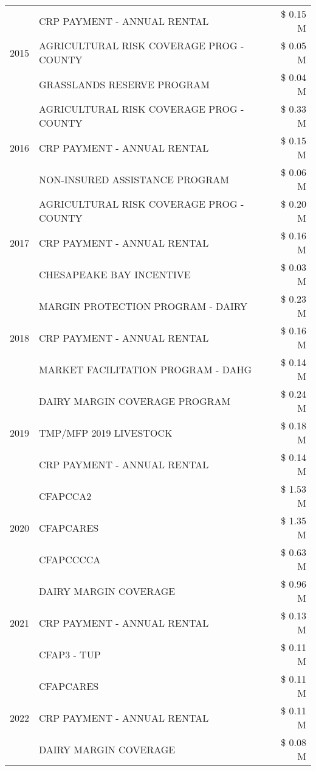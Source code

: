 \begin{tabular}{llr}
\cline{1-3}
\multirow[t]{3}{*}{2015} & CRP PAYMENT - ANNUAL RENTAL & \$ 0.15 M \\
 & AGRICULTURAL RISK COVERAGE PROG - COUNTY & \$ 0.05 M \\
 & GRASSLANDS RESERVE PROGRAM & \$ 0.04 M \\
\cline{1-3}
\multirow[t]{3}{*}{2016} & AGRICULTURAL RISK COVERAGE PROG - COUNTY & \$ 0.33 M \\
 & CRP PAYMENT - ANNUAL RENTAL & \$ 0.15 M \\
 & NON-INSURED ASSISTANCE PROGRAM & \$ 0.06 M \\
\cline{1-3}
\multirow[t]{3}{*}{2017} & AGRICULTURAL RISK COVERAGE PROG - COUNTY & \$ 0.20 M \\
 & CRP PAYMENT - ANNUAL RENTAL & \$ 0.16 M \\
 & CHESAPEAKE BAY INCENTIVE & \$ 0.03 M \\
\cline{1-3}
\multirow[t]{3}{*}{2018} & MARGIN PROTECTION PROGRAM - DAIRY & \$ 0.23 M \\
 & CRP PAYMENT - ANNUAL RENTAL & \$ 0.16 M \\
 & MARKET FACILITATION PROGRAM - DAHG & \$ 0.14 M \\
\cline{1-3}
\multirow[t]{3}{*}{2019} & DAIRY MARGIN COVERAGE PROGRAM & \$ 0.24 M \\
 & TMP/MFP 2019 LIVESTOCK & \$ 0.18 M \\
 & CRP PAYMENT - ANNUAL RENTAL & \$ 0.14 M \\
\cline{1-3}
\multirow[t]{3}{*}{2020} & CFAPCCA2 & \$ 1.53 M \\
 & CFAPCARES & \$ 1.35 M \\
 & CFAPCCCCA & \$ 0.63 M \\
\cline{1-3}
\multirow[t]{3}{*}{2021} & DAIRY MARGIN COVERAGE & \$ 0.96 M \\
 & CRP PAYMENT - ANNUAL RENTAL & \$ 0.13 M \\
 & CFAP3 - TUP & \$ 0.11 M \\
\cline{1-3}
\multirow[t]{3}{*}{2022} & CFAPCARES & \$ 0.11 M \\
 & CRP PAYMENT - ANNUAL RENTAL & \$ 0.11 M \\
 & DAIRY MARGIN COVERAGE & \$ 0.08 M \\
\cline{1-3}
\bottomrule
\end{tabular}
